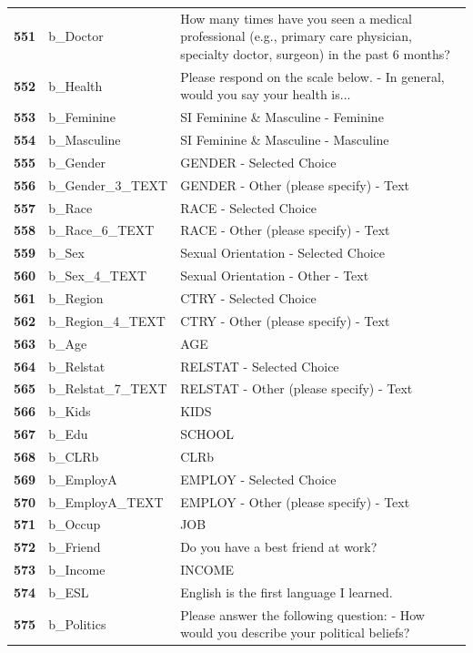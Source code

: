 \documentclass[
  letterpaper,
  DIV=11,
  numbers=noendperiod]{scrartcl}
\begin{document}
\begin{longtable}[t]{>{}cll}
\textbf{551} & b\_Doctor & How many times have you seen a medical professional (e.g., primary care physician, specialty doctor, surgeon) in the past 6 months?\\
\textbf{552} & b\_Health & Please respond on the scale below. - In general, would you say your health is...\\
\textbf{553} & b\_Feminine & SI Feminine \& Masculine - Feminine\\
\textbf{554} & b\_Masculine & SI Feminine \& Masculine - Masculine\\
\textbf{555} & b\_Gender & GENDER - Selected Choice\\
\addlinespace
\textbf{556} & b\_Gender\_3\_TEXT & GENDER - Other (please specify) - Text\\
\textbf{557} & b\_Race & RACE - Selected Choice\\
\textbf{558} & b\_Race\_6\_TEXT & RACE - Other (please specify) - Text\\
\textbf{559} & b\_Sex & Sexual Orientation - Selected Choice\\
\textbf{560} & b\_Sex\_4\_TEXT & Sexual Orientation - Other - Text\\
\addlinespace
\textbf{561} & b\_Region & CTRY - Selected Choice\\
\textbf{562} & b\_Region\_4\_TEXT & CTRY - Other (please specify) - Text\\
\textbf{563} & b\_Age & AGE\\
\textbf{564} & b\_Relstat & RELSTAT - Selected Choice\\
\textbf{565} & b\_Relstat\_7\_TEXT & RELSTAT - Other (please specify) - Text\\
\addlinespace
\textbf{566} & b\_Kids & KIDS\\
\textbf{567} & b\_Edu & SCHOOL\\
\textbf{568} & b\_CLRb & CLRb\\
\textbf{569} & b\_EmployA & EMPLOY - Selected Choice\\
\textbf{570} & b\_EmployA\_TEXT & EMPLOY - Other (please specify) - Text\\
\addlinespace
\textbf{571} & b\_Occup & JOB\\
\textbf{572} & b\_Friend & Do you have a best friend at work?\\
\textbf{573} & b\_Income & INCOME\\
\textbf{574} & b\_ESL & English is the first language I learned.\\
\textbf{575} & b\_Politics & Please answer the following question: - How would you describe your political beliefs?\\

\end{longtable}
\end{document}

